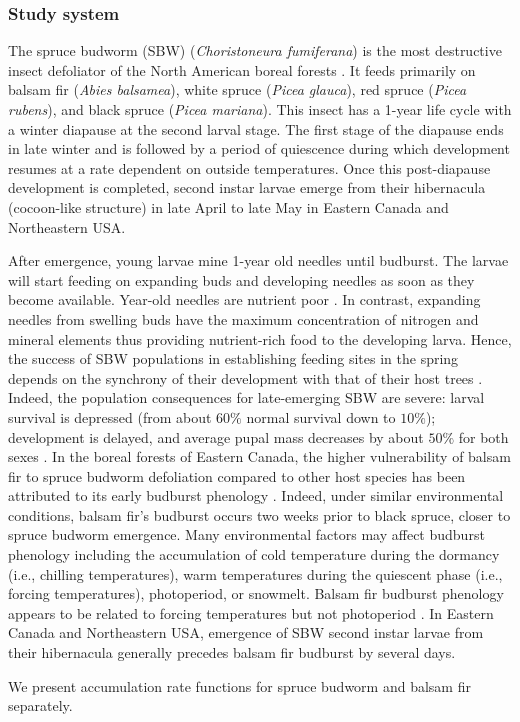 \documentclass[12 pt]{article}
\begin{document}
\subsubsection{Study system} 
The spruce budworm (SBW) (\textit{Choristoneura fumiferana}) is the most destructive insect defoliator of the North American boreal forests \citep{Fleming2000}. It feeds primarily on balsam fir (\textit{Abies balsamea}), white spruce (\textit{Picea glauca}), red spruce (\textit{Picea rubens}), and black spruce (\textit{Picea mariana}). This insect has a 1-year life cycle with a winter diapause at the second larval stage. The first stage of the diapause ends in late winter and is followed by a period of quiescence during which development resumes at a rate dependent on outside temperatures. Once this post-diapause development is completed, second instar larvae emerge from their hibernacula (cocoon-like structure) in late April to late May in Eastern Canada and Northeastern USA.\par 
After emergence, young larvae mine 1-year old needles until budburst. The larvae will start feeding on expanding buds and developing needles as soon as they become available. Year-old needles are nutrient poor \citep{Mattson1987}. In contrast, expanding needles from swelling buds have the maximum concentration of nitrogen and mineral elements thus providing nutrient-rich food to the developing larva. Hence, the success of SBW populations in establishing feeding sites in the spring depends on the synchrony of their development with that of their host trees \citep{Regniere2008,Volney2007}. Indeed, the population consequences for late-emerging SBW are severe: larval survival is depressed (from about $60\%$ normal survival down to $10\%$); development is delayed, and average pupal mass decreases by about $50\%$ for both sexes \citep{Lawrence1997}. In the boreal forests of Eastern Canada, the higher vulnerability of balsam fir to spruce budworm defoliation compared to other host species has been attributed to its early budburst phenology \citep{Blais1957}. Indeed, under similar environmental conditions, balsam fir's budburst occurs two weeks prior to black spruce, closer to spruce budworm emergence. Many environmental factors may affect budburst phenology including the accumulation of cold temperature during the dormancy (i.e., chilling temperatures), warm temperatures during the quiescent phase (i.e., forcing temperatures), photoperiod, or snowmelt. Balsam fir budburst phenology appears to be related to forcing temperatures but not photoperiod \citep{Osawa1983}. In Eastern Canada and Northeastern USA, emergence of SBW second instar larvae from their hibernacula generally precedes balsam fir budburst by several days.\par 
We present accumulation rate functions for spruce budworm and balsam fir separately. 
\end{document}
